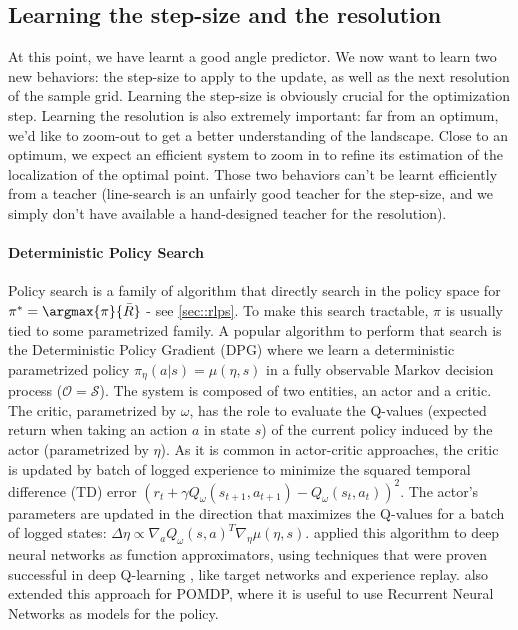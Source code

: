 		\subsection{Learning the step-size and the resolution}
		\label{sec::rl_reso}
		
		 At this point, we have learnt a good angle predictor. We now want to learn two new behaviors: the step-size to apply to the update, as well as the next resolution of the sample grid. Learning the step-size is obviously crucial for the optimization step. Learning the resolution is also extremely important: far from an optimum, we'd like to zoom-out to get a better understanding of the landscape. Close to an optimum, we expect an efficient system to zoom in to refine its estimation of the localization of the optimal point. Those two behaviors can't be learnt efficiently from a teacher (line-search is an unfairly good teacher for the step-size, and we simply don't have available a hand-designed teacher for the resolution).
			
		\paragraph{Deterministic Policy Search} Policy search is a family of algorithm that directly search in the policy space for $\pi^* = \argmax{\pi}{\bar{R}}$ - see \ref{sec::rlps}. To make this search tractable, $\pi$ is usually tied to some parametrized family. A popular algorithm to perform that search is the Deterministic Policy Gradient \cite{silver2014deterministic} (DPG) where we learn a deterministic parametrized policy $\pi_\eta(a\vert s) = \mu(\eta,s)$ in a fully observable Markov decision process ($\mathcal{O}=\mathcal{S}$). The system is composed of two entities, an actor and a critic. The critic, parametrized by $\omega$, has the role to evaluate the Q-values (expected return when taking an action $a$ in state $s$) of the current policy induced by the actor (parametrized by $\eta$). As it is common in actor-critic approaches, the critic is updated by batch of logged experience to minimize the squared temporal difference (TD) error $\left(r_t + \gamma Q_\omega(s_{t+1},a_{t+1}) - Q_\omega(s_t,a_t)\right)^2$. The actor's parameters are updated in the direction that maximizes the Q-values for a batch of logged states: $\Delta \eta \propto \nabla_a Q_\omega(s,a)^T \nabla_\eta \mu(\eta,s)$. \cite{lillicrap2015continuous} applied this algorithm to deep neural networks as function approximators, using techniques that were proven successful in deep Q-learning \cite{mnih2015human}, like target networks and experience replay. \cite{heess2015memory} also extended this approach for POMDP, where it is useful to use Recurrent Neural Networks as models for the policy.
			
